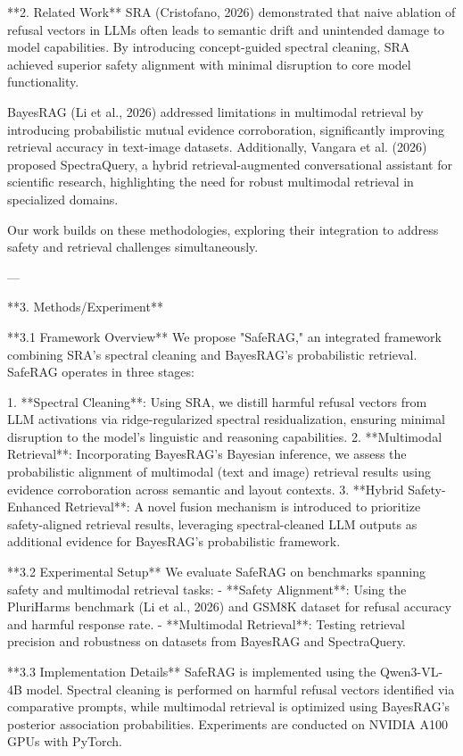 **2. Related Work**  
SRA (Cristofano, 2026) demonstrated that naive ablation of refusal vectors in LLMs often leads to semantic drift and unintended damage to model capabilities. By introducing concept-guided spectral cleaning, SRA achieved superior safety alignment with minimal disruption to core model functionality.

BayesRAG (Li et al., 2026) addressed limitations in multimodal retrieval by introducing probabilistic mutual evidence corroboration, significantly improving retrieval accuracy in text-image datasets. Additionally, Vangara et al. (2026) proposed SpectraQuery, a hybrid retrieval-augmented conversational assistant for scientific research, highlighting the need for robust multimodal retrieval in specialized domains.

Our work builds on these methodologies, exploring their integration to address safety and retrieval challenges simultaneously.

---

**3. Methods/Experiment**  

**3.1 Framework Overview**  
We propose "SafeRAG," an integrated framework combining SRA's spectral cleaning and BayesRAG's probabilistic retrieval. SafeRAG operates in three stages:

1. **Spectral Cleaning**: Using SRA, we distill harmful refusal vectors from LLM activations via ridge-regularized spectral residualization, ensuring minimal disruption to the model’s linguistic and reasoning capabilities.  
2. **Multimodal Retrieval**: Incorporating BayesRAG's Bayesian inference, we assess the probabilistic alignment of multimodal (text and image) retrieval results using evidence corroboration across semantic and layout contexts.  
3. **Hybrid Safety-Enhanced Retrieval**: A novel fusion mechanism is introduced to prioritize safety-aligned retrieval results, leveraging spectral-cleaned LLM outputs as additional evidence for BayesRAG's probabilistic framework.  

**3.2 Experimental Setup**  
We evaluate SafeRAG on benchmarks spanning safety and multimodal retrieval tasks:  
- **Safety Alignment**: Using the PluriHarms benchmark (Li et al., 2026) and GSM8K dataset for refusal accuracy and harmful response rate.  
- **Multimodal Retrieval**: Testing retrieval precision and robustness on datasets from BayesRAG and SpectraQuery.  

**3.3 Implementation Details**  
SafeRAG is implemented using the Qwen3-VL-4B model. Spectral cleaning is performed on harmful refusal vectors identified via comparative prompts, while multimodal retrieval is optimized using BayesRAG's posterior association probabilities. Experiments are conducted on NVIDIA A100 GPUs with PyTorch.

